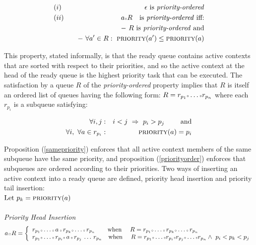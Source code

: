 \begin{eqnarray}
  & (i) &  \epsilon \ \text{is \emph{priority-ordered}}\\
  & (ii) & a \smcirc R \ \  \text{ is \emph{priority-ordered} iff:} \\
  & \nonumber & \quad -\ R \text{ is \emph{priority-ordered} and}  \\
  & \nonumber & \quad -\ \forall a' \in R:\ 
  \text{\scshape priority}(a') \leq \text{\scshape priority}(a)
\end{eqnarray}

This property, stated informally, is that the ready queue contains
active contexts that are sorted with respect to their priorities, and
so the active context at the head of the ready queue is the highest
priority task that can be executed.  The satisfaction by a queue $R$
of the \emph{priority-ordered} property implies that $R$ is itself an
ordered list of queues having the following form: $R= r_{p_1} {\scriptscriptstyle \circ}
\ldots {\scriptscriptstyle \circ} r_{p_n}$ where each $r_{p_i}$ is a subqueue satisfying:

\begin{eqnarray}
 \forall i,j &:&  i<j \ \Rightarrow \ p_i > p_j	\ \ \ \ \ \ \  \text{and}	  
 \label{priorityorder}\\ 
 \forall i, \ \forall a \in r_{p_i} & : & \text{\scshape priority}(a) = p_i 
 \label{samepriority}
\end{eqnarray}

Proposition (\ref{samepriority}) enforces that all active context
members of the same subqueue have the same priority, and proposition
(\ref{priorityorder}) enforces that subqueues are ordered according to
their priorities. Two ways of inserting an active context into a ready
queue are defined, priority head insertion and priority tail insertion:\\

\noindent
$\text{Let }p_k = \text{\scshape priority}(a) $\\
\\
\hspace{-7mm} \emph{Priority Head Insertion} \\
\begin{equation}
\label{pri_hd_ins}
  a \smodot R = \left \{
    \begin{array}{l}
      r_{p_1}\smcirc\ldots\smcirc\,a\,\smcirc\,r_{p_k}\smcirc\ldots\smcirc\,r_{p_n} 
      \ \ \ \ \ \ \text{when}\ \ \ \ 
      R=r_{p_1}\smcirc\ldots\smcirc\,r_{p_k}\smcirc\ldots\smcirc\,r_{p_n}  \\ 
      r_{p_1}\smcirc\ldots\smcirc\,r_{p_i}\smcirc\,a\,\smcirc\,r_{p_j}\,\ldots\,r_{p_n}
      \ \ \ \text{when} \  \ \ \ 
      R = r_{p_1}\smcirc\ldots\smcirc r_{p_i}\smcirc
      r_{p_j}\smcirc\ldots\smcirc r_{p_n} \wedge \  p_i < p_k < p_j 
    \end{array} 
  \right.
\end{equation}


